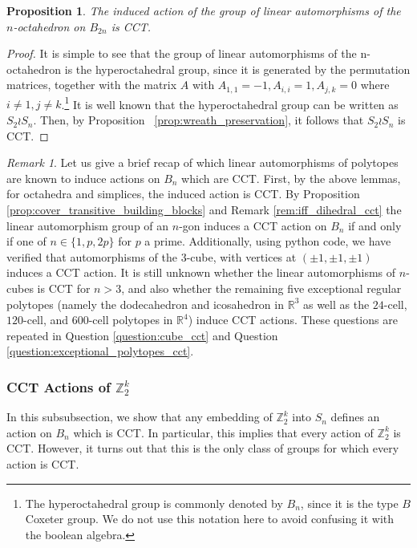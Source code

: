 \documentclass[smallextended, envcountsame, numbook]{svjour3}
\theoremstyle{plain}
\newtheorem{prop}[thm]{Proposition}
\theoremstyle{definition}
\theoremstyle{remark}
\newtheorem{rmk}[thm]{Remark}
\numberwithin{equation}{section}
\newcommand\sssec{\subsubsection}
\begin{document}
\begin{prop}
The induced action of the group of linear automorphisms of the $n$-octahedron on $B_{2n}$ is CCT.
\end{prop}
\begin{proof}
It is simple to see that the group of linear automorphisms of the n-octahedron is the hyperoctahedral group, since it is generated by the permutation matrices, together with the matrix $A$ with $A_{1,1} = -1,A_{i,i} = 1,A_{j,k} = 0$ where $i \neq 1, j \neq k$.\footnote{The hyperoctahedral group is commonly denoted by $B_n$, since it is the type $B$ Coxeter group. We do not use this notation here to avoid confusing it with the boolean algebra.} It is well known that the hyperoctahedral group can be written as $S_2 \wr S_n$. Then, by Proposition ~\ref{prop:wreath_preservation}, it follows that $S_2 \wr S_n$ is CCT.
\end{proof}

\begin{rmk}
Let us give a brief recap of which linear automorphisms of polytopes are known to induce actions on $B_n$ which are CCT. First, by the above lemmas, for octahedra and simplices, the induced action is CCT. By Proposition  \ref{prop:cover_transitive_building_blocks} and Remark \ref{rem:iff_dihedral_cct} the linear automorphism group of an $n$-gon induces a CCT action on $B_n$ if and only if one of $n\in \{1,p,2p\}$ for $p$ a prime. Additionally, using python code, we have verified that automorphisms of the 3-cube, with vertices at $(\pm 1,\pm 1,\pm 1)$ induces a CCT action. It is still unknown whether the linear automorphisms of $n$-cubes is CCT for $n> 3$, and also whether the remaining five exceptional regular polytopes (namely the dodecahedron and icosahedron in $\mathbb R^3$ as well as the $24$-cell, $120$-cell, and $600$-cell polytopes in $\mathbb R^4$) induce CCT actions. These questions are repeated in Question \ref{question:cube_cct} and Question \ref{question:exceptional_polytopes_cct}.

\end{rmk}

\sssec{CCT Actions of $\mathbb Z_2^k$}

In this subsubsection, we show that any embedding of $\mathbb Z_2^k$ into $S_n$ defines an action on $B_n$ which is CCT. In particular, this implies that every action of $\mathbb Z_2^k$ is CCT. However, it turns out that this is the only class of groups for which every action is CCT.
\end{document}
